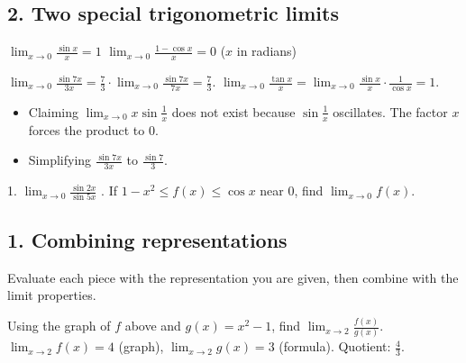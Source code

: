 \subsection*{2. Two special trigonometric limits}
\begin{keyidea}
$\displaystyle\lim_{x\to0}\frac{\sin x}{x}=1$ \qquad $\displaystyle\lim_{x\to0}\frac{1-\cos x}{x}=0$ \qquad ($x$ in radians)
\end{keyidea}
\begin{example}[Example 2]
\sol $\displaystyle\lim_{x\to0}\frac{\sin 7x}{3x}=\frac73\cdot\lim_{x\to0}\frac{\sin7x}{7x}=\frac73$.\qquad
$\displaystyle\lim_{x\to0}\frac{\tan x}{x}=\lim_{x\to0}\frac{\sin x}{x}\cdot\frac{1}{\cos x}=1$.
\end{example}

\begin{mistakes}
\begin{itemize}
\item Claiming $\lim_{x\to0}x\sin\frac1x$ does not exist because $\sin\frac1x$ oscillates. The factor $x$ forces the product to $0$.
\item Simplifying $\frac{\sin7x}{3x}$ to $\frac{\sin7}{3}$.
\end{itemize}
\end{mistakes}

\begin{quickcheck}
1. $\displaystyle\lim_{x\to0}\frac{\sin2x}{\sin5x}$ . If $1-x^2\le f(x)\le\cos x$ near $0$, find $\lim_{x\to0}f(x)$.
\end{quickcheck}


\fgraph
\subsection*{1. Combining representations}
Evaluate each piece with the representation you are given, then combine with the limit properties.

\begin{example}[Example 1]
Using the graph of $f$ above and $g(x)=x^2-1$, find $\displaystyle\lim_{x\to2}\frac{f(x)}{g(x)}$.
\sol $\lim_{x\to2}f(x)=4$ (graph), $\lim_{x\to2}g(x)=3$ (formula). Quotient: $\frac43$.
\end{example}

